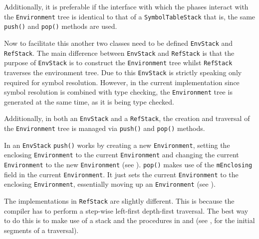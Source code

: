 Additionally, it is preferable if the interface with which the
phases interact with the \texttt{Environment} tree is identical
to that of a \texttt{SymbolTableStack} that is, the same
\texttt{push()} and \texttt{pop()} methods are used.

Now to facilitate this another two classes need to be defined
\texttt{EnvStack} and \\ \texttt{RefStack}. The main difference
between \texttt{EnvStack} and \texttt{RefStack} is that the
purpose of \texttt{EnvStack} is to construct the
\texttt{Environment} tree whilst \texttt{RefStack} traverses the
environment tree. Due to this \texttt{EnvStack} is strictly
speaking only required for symbol resolution. However, in the
current implementation since symbol resolution is combined with
type checking, the \texttt{Environment} tree is generated at the
same time, as it is being type checked.

Additionally, in both an \texttt{EnvStack} and a
\texttt{RefStack}, the creation and traversal of the
\texttt{Environment} tree is managed via \texttt{push()} and
\texttt{pop()} methods.

In an \texttt{EnvStack} \texttt{push()} works by creating a new
\texttt{Environment}, setting the enclosing \texttt{Environment}
to the current \texttt{Environment} and changing the current \\
\texttt{Environment} to the new \texttt{Environment} (see
). \texttt{pop()} makes use of the
\texttt{mEnclosing} field in the current \texttt{Environment}.
It just sets the current \texttt{Environment} to the enclosing
\texttt{Environment}, essentially moving up an
\texttt{Environment} (see ).





The implementations in \texttt{RefStack} are slightly different.
This is because the compiler has to perform a step-wise
left-first depth-first traversal. The best way to do this is to
make use of a stack and the procedures in  and
 (see , for the initial
segments of a traversal).

